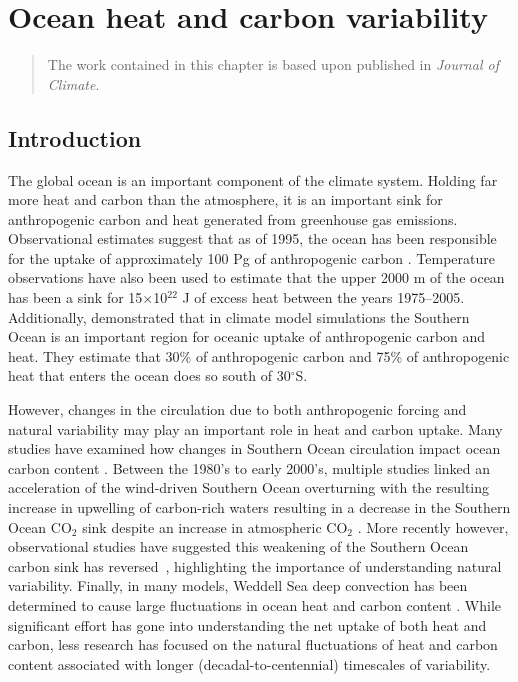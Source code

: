 \graphicspath{{figures/chapter-ocean-heat-carbon/}} %

\chapter{Ocean heat and carbon variability}
\label{cha:ocean_heat_carbon}

\begin{quotation}
  The work contained in this chapter is based upon \citet{Thomas2017} published in
  \textit{Journal of Climate}.
\end{quotation}

\section{Introduction}
The global ocean is an important component of the climate system. Holding far more
heat and carbon than the atmosphere, it is an
important sink for anthropogenic carbon and heat generated from greenhouse gas
emissions. Observational estimates suggest that as of 1995, the ocean has been
responsible for the uptake of approximately 100 Pg of anthropogenic carbon
\citep{Khatiwala2012,Sabine2004,Waugh2006}. Temperature observations have also
been used to estimate that the upper 2000 m of the ocean has been a sink for
15$\times$10$^{\mathrm{22}}$ J of excess heat \citep{Levitus2009} between the
years 1975--2005. Additionally, \citet{Frolicher2015} demonstrated that in
climate model simulations the Southern Ocean is an important region for oceanic
uptake of anthropogenic carbon and heat. They estimate that 30\% of
anthropogenic carbon and 75\% of anthropogenic heat that enters the ocean does
so south of 30$^{\circ}$S.

However, changes in the circulation due to both anthropogenic forcing and
natural variability may play an important role in heat and carbon uptake. Many
studies have examined how changes in Southern Ocean circulation impact ocean
carbon content \citep{Sarmiento1984,Sarmiento1996,Marinov2008}. Between the
1980's to early 2000's, multiple studies linked an acceleration of the
wind-driven Southern Ocean overturning with the resulting increase in upwelling
of carbon-rich waters resulting in a decrease in the Southern Ocean
CO$_{\mathrm{2}}$ sink despite an increase in atmospheric CO$_2$
\citep{LeQuere2000h,Lovenduski2007,Lenton2009}. More recently however,
observational studies have suggested this weakening of the Southern Ocean carbon
sink has reversed~\citep{Landsch2015,Devries2017}, highlighting the importance
of understanding natural variability.
Finally, in many models, Weddell Sea deep convection has been
determined to cause large fluctuations in ocean heat \citep{Latif2013,
DeLavergne2014a} and carbon content \citep{Bernardello2014}. While significant
effort has gone into understanding the net uptake of both heat and carbon, less
research has focused on the natural fluctuations of heat and carbon content
associated with longer (decadal-to-centennial) timescales of variability.

